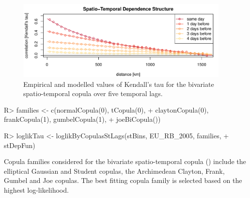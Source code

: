 \documentclass[article,nojss]{jss}
\begin{document}
\begin{figure}
\center
\includegraphics[width=0.95\textwidth]{correlogram.pdf}
\caption{Empirical and modelled values of Kendall's tau for the bivariate spatio-temporal copula over five temporal lags.\label{fig:stCopula}}
\end{figure}

\begin{Schunk}
\begin{Sinput}
R> families <- c(normalCopula(0), tCopula(0),
+                claytonCopula(0), frankCopula(1), gumbelCopula(1), 
+                joeBiCopula())
\end{Sinput}
\end{Schunk}

\begin{Schunk}
\begin{Sinput}
R> loglikTau <- loglikByCopulasStLags(stBins, EU_RB_2005, families,
+                                     stDepFun)
\end{Sinput}
\end{Schunk}


Copula families considered for the bivariate spatio-temporal copula () include the elliptical Gaussian and Student copulas, the Archimedean Clayton, Frank, Gumbel \citep{Nelsen2006} and Joe \citep{Joe1997} copulas. %
The best fitting copula family is selected based on the highest log-likelihood. %

\begin{Schunk}
\end{Schunk}
\end{document}
